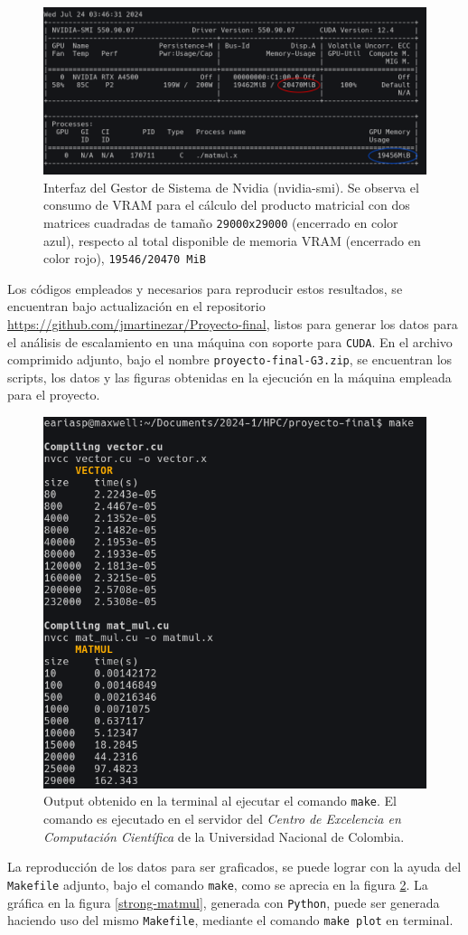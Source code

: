 \documentclass[journal, onecolumn, a4paper, 11pt]{IEEEtran}
\begin{document}
\begin{figure}[h!]
    \centering
        \includegraphics[width=0.8\linewidth]{figs/aux/vram-consumpt.png}
    \caption{Interfaz del Gestor de Sistema de Nvidia (nvidia-smi). Se observa el consumo de VRAM para el cálculo del producto matricial con dos matrices cuadradas de tamaño \texttt{29000x29000} (encerrado en color azul), respecto al total disponible de memoria VRAM (encerrado en color rojo), \texttt{19546/20470 MiB}}
    \label{vram-consumpt}
\end{figure}

Los códigos empleados y necesarios para reproducir estos resultados, se encuentran bajo actualización en el repositorio \url{https://github.com/jmartinezar/Proyecto-final}, listos para generar los datos para el análisis de escalamiento en una máquina con soporte para \texttt{CUDA}. En el archivo comprimido adjunto, bajo el nombre \texttt{proyecto-final-G3.zip}, se encuentran los scripts, los datos y las figuras obtenidas en la ejecución en la máquina empleada para el proyecto.

\begin{figure}[h!]
    \centering
        \includegraphics[width=0.6\linewidth]{figs/aux/termout.png}
    \caption{Output obtenido en la terminal al ejecutar el comando \texttt{make}. El comando es ejecutado en el servidor del \textit{Centro de Excelencia en Computación Científica} de la Universidad Nacional de Colombia.}
    \label{termout}
\end{figure}

La reproducción de los datos para ser graficados, se puede lograr con la ayuda del \texttt{Makefile} adjunto, bajo el comando \texttt{make}, como se aprecia en la figura \ref{termout}. La gráfica en la figura \ref{strong-matmul}, generada con \texttt{Python}, puede ser generada haciendo uso del mismo \texttt{Makefile}, mediante el comando \texttt{make plot} en terminal.
\end{document}

